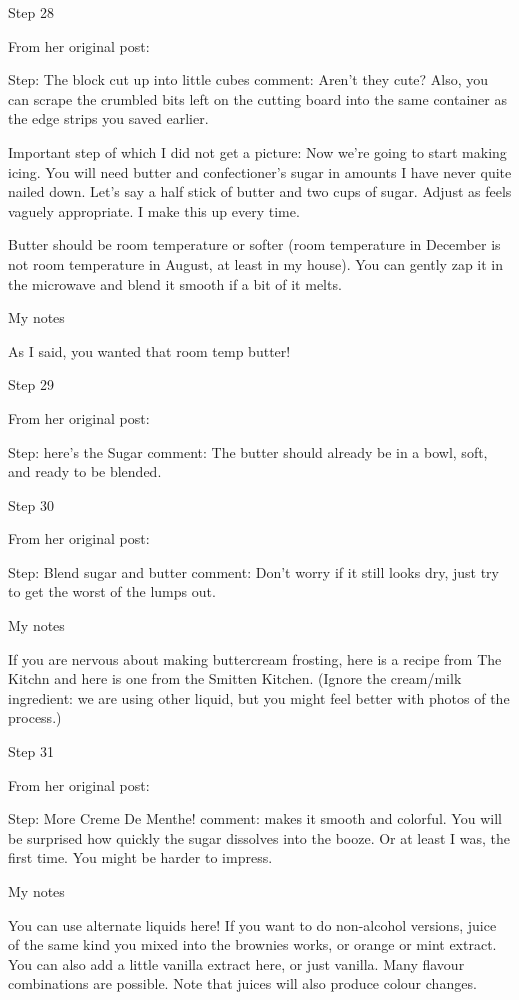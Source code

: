 Step 28

From her original post:

Step: The block cut up into little cubes
comment: Aren't they cute? Also, you can scrape the crumbled bits left on the cutting board into the same container as the edge strips you saved earlier.

Important step of which I did not get a picture: Now we're going to start making icing. You will need butter and confectioner's sugar in amounts I have never quite nailed down. Let's say a half stick of butter and two cups of sugar. Adjust as feels vaguely appropriate. I make this up every time.

Butter should be room temperature or softer (room temperature in December is not room temperature in August, at least in my house). You can gently zap it in the microwave and blend it smooth if a bit of it melts.

My notes

As I said, you wanted that room temp butter!

Step 29

From her original post:

Step: here's the Sugar
comment: The butter should already be in a bowl, soft, and ready to be blended.

Step 30

From her original post:

Step: Blend sugar and butter
comment: Don't worry if it still looks dry, just try to get the worst of the lumps out.

My notes

If you are nervous about making buttercream frosting, here is a recipe from The Kitchn and here is one from the Smitten Kitchen. (Ignore the cream/milk ingredient: we are using other liquid, but you might feel better with photos of the process.)

Step 31

From her original post:

Step: More Creme De Menthe!
comment: makes it smooth and colorful. You will be surprised how quickly the sugar dissolves into the booze. Or at least I was, the first time. You might be harder to impress.

My notes

You can use alternate liquids here! If you want to do non-alcohol versions, juice of the same kind you mixed into the brownies works, or orange or mint extract. You can also add a little vanilla extract here, or just vanilla. Many flavour combinations are possible. Note that juices will also produce colour changes.

